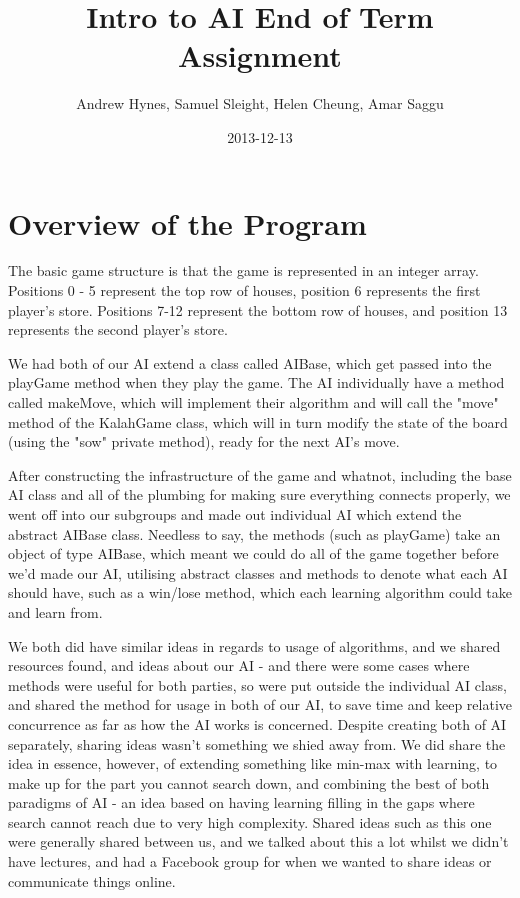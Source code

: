 \documentclass[11pt]{article}
\author{Andrew Hynes, Samuel Sleight, Helen Cheung, Amar Saggu}
\date{2013-12-13}
\title{Intro to AI End of Term Assignment}
\begin{document}
\maketitle
\tableofcontents


\section{Overview of the Program}
\label{sec-1}

The basic game structure is that the game is represented in an integer array. Positions 0 - 5 represent the top row of houses, position 6 represents the first player's store. Positions 7-12 represent the bottom row of houses, and position 13 represents the second player's store.

We had both of our AI extend a class called AIBase, which get passed into the playGame method when they play the game. The AI individually have a method called makeMove, which will implement their algorithm and will call the "move" method of the KalahGame class, which will in turn modify the state of the board (using the "sow" private method), ready for the next AI's move.

After constructing the infrastructure of the game and whatnot, including the base AI class and all of the plumbing for making sure everything connects properly, we went off into our subgroups and made out individual AI which extend the abstract AIBase class. Needless to say, the methods (such as playGame) take an object of type AIBase, which meant we could do all of the game together before we'd made our AI, utilising abstract classes and methods to denote what each AI should have, such as a win/lose method, which each learning algorithm could take and learn from.

We both did have similar ideas in regards to usage of algorithms, and we shared resources found, and ideas about our AI - and there were some cases where methods were useful for both parties, so were put outside the individual AI class, and shared the method for usage in both of our AI, to save time and keep relative concurrence as far as how the AI works is concerned. Despite creating both of AI separately, sharing ideas wasn't something we shied away from. We did share the idea in essence, however, of extending something like min-max with learning, to make up for the part you cannot search down, and combining the best of both paradigms of AI - an idea based on having learning filling in the gaps where search cannot reach due to very high complexity. Shared ideas such as this one were generally shared between us, and we talked about this a lot whilst we didn't have lectures, and had a Facebook group for when we wanted to share ideas or communicate things online.
\end{document}
